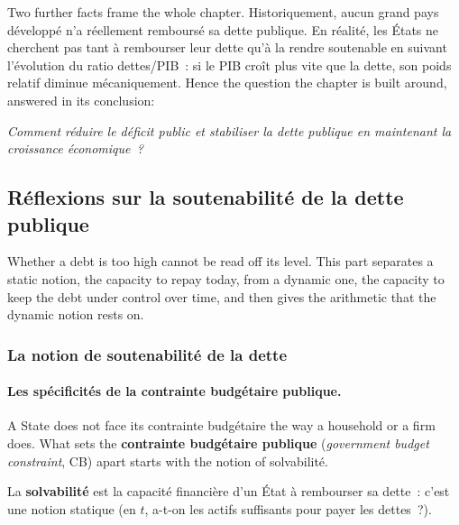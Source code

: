 Two further facts frame the whole chapter. Historiquement, aucun grand pays
développé n'a réellement remboursé sa dette publique. En réalité, les États ne
cherchent pas tant à rembourser leur dette qu'à la rendre soutenable en suivant
l'évolution du ratio dettes/PIB~: si le PIB croît plus vite que la dette, son
poids relatif diminue mécaniquement. Hence the question the chapter is built
around, answered in its conclusion:

\begin{center}
  \emph{Comment réduire le déficit public et stabiliser la dette publique en
  maintenant la croissance économique~?}
\end{center}

\subsection{Réflexions sur la soutenabilité de la dette publique}

Whether a debt is too high cannot be read off its level. This part separates a
static notion, the capacity to repay today, from a dynamic one, the capacity to
keep the debt under control over time, and then gives the arithmetic that the
dynamic notion rests on.

\subsubsection{La notion de soutenabilité de la dette}

\paragraph{Les spécificités de la contrainte budgétaire publique.}
A State does not face its contrainte budgétaire the way a household or a
firm does. What sets the \textbf{contrainte budgétaire publique}
(\textit{government budget constraint}, CB) apart starts with the notion of
solvabilité.

\begin{definition}
  La \textbf{solvabilité} est la capacité financière d'un État à rembourser sa
  dette~: c'est une notion statique (en $t$, a-t-on les actifs suffisants pour
  payer les dettes~?).
\end{definition}

